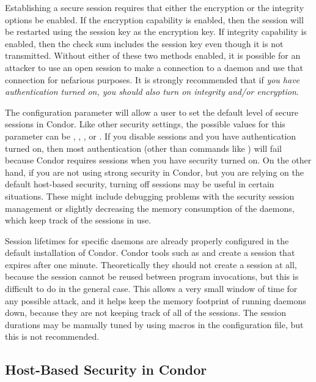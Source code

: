 Establishing a secure session requires that either the encryption or the integrity options be enabled.
If the encryption capability is enabled, then the session will be restarted using the session key
as the encryption key.
If integrity capability is enabled, then the check sum includes the session key even
though it is not transmitted.
Without either of these two methods enabled,
it is possible for an
attacker to use an open session to make a connection to a daemon and
use that connection for nefarious purposes.
It is strongly recommended that if \emph{you have authentication turned
on, you should also turn on integrity and/or encryption}.

The configuration parameter  will allow
a user to set the default level of secure sessions in Condor.
Like other security settings, the possible values for this parameter can be
\verb@REQUIRED@, \verb@PREFERRED@, \verb@OPTIONAL@,
or \verb@NEVER@.
If you disable sessions and you have authentication turned
on, then most authentication (other than commands like
) will fail because Condor requires sessions when you
have security turned on. 
On the other hand, if you are not using strong security in Condor, but
you are relying on the default host-based security, turning off
sessions may be useful in certain situations. These might include debugging problems
with the security session management or slightly decreasing the memory
consumption of the daemons, which keep track of the sessions in use. 

Session lifetimes for specific daemons are already properly configured in the default installation
of Condor.
Condor tools such as  and  create a
session that expires after one minute. 
Theoretically they should not create a session at all,
because the
session cannot be reused between program invocations, but this is
difficult to do in the general case.
This allows a very small window of time for any possible attack,
and it helps
keep the memory footprint of running daemons down,
because they are not keeping track of all of the sessions.
The session durations may be manually tuned
by using macros in the configuration file,
but this is not recommended.


\subsection{\label{sec:Host-Security}Host-Based Security in
Condor} 

